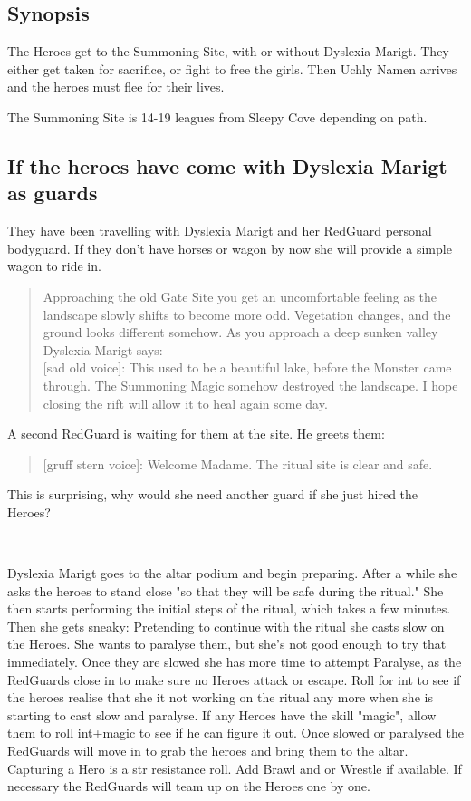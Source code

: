\documentclass[11pt, twoside, titlepage, a4paper]{report}
\newenvironment{readoutloud}%
{\begin{quote}\begin{itshape}}%
{\end{itshape}\end{quote}}%
\begin{document}
\subsection*{Synopsis}
The Heroes get to the Summoning Site, with or without Dyslexia Marigt. They either get taken for sacrifice, or fight to free the girls. Then Uchly Namen arrives and the heroes must flee for their lives.

The Summoning Site is 14-19 leagues from Sleepy Cove depending on path.


\subsection*{If the heroes have come with Dyslexia Marigt as guards}
They have been travelling with Dyslexia Marigt and her RedGuard personal bodyguard. If they don't have horses or wagon by now she will provide a simple wagon to ride in.
\begin{readoutloud}
Approaching the old Gate Site you get an uncomfortable feeling as the landscape slowly shifts to become more odd. Vegetation changes, and the ground looks different somehow. As you approach a deep sunken valley Dyslexia Marigt says:\\

\textnormal{[sad old voice]:} This used to be a beautiful lake, before the Monster came through. The Summoning Magic somehow destroyed the landscape. I hope closing the rift will allow it to heal again some day.
\end{readoutloud}

A second RedGuard is waiting for them at the site. He greets them:
\begin{readoutloud}
\textnormal{[gruff stern voice]:} Welcome Madame. The ritual site is clear and safe.
\end{readoutloud}
This is surprising, why would she need another guard if she just hired the Heroes?

\

Dyslexia Marigt goes to the altar podium and begin preparing. After a while she asks the heroes to stand close "so that they will be safe during the ritual."
She then starts performing the initial steps of the ritual, which takes a few minutes. Then she gets sneaky: Pretending to continue with the ritual she casts slow on the Heroes. She wants to paralyse them, but she's not good enough to try that immediately. Once they are slowed she has more time to attempt Paralyse, as the RedGuards close in to make sure no Heroes attack or escape.
Roll for int to see if the heroes realise that she it not working on the ritual any more when she is starting to cast slow and paralyse. If any Heroes have the skill "magic", allow them to roll int+magic to see if he can figure it out.
Once slowed or paralysed the RedGuards will move in to grab the heroes and bring them to the altar. Capturing a Hero is a str resistance roll. Add Brawl and or Wrestle if available. If necessary the RedGuards will team up on the Heroes one by one.
\end{document}
